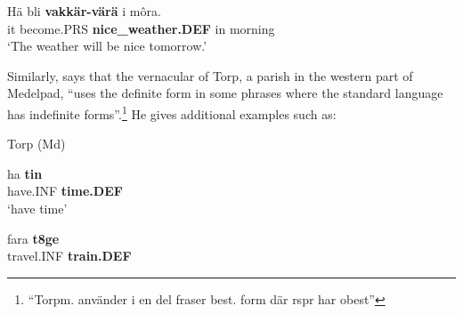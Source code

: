 
 \ea\label{}
\gll Hä  bli  \textbf{vakkär-värä} i  môra.\\


it  become.PRS  \textbf{nice\_weather.DEF} in  morning\\

\glt ‘The weather will be nice tomorrow.’

\z

Similarly, \citet[140]{Bogren1921} says that the vernacular of Torp, a parish in the western part of Medelpad, “uses the definite form in some phrases where the standard language has indefinite forms”.\footnote{ “Torpm. använder i en del fraser best. form där rspr har obest”} He gives additional examples such as:


\item 

Torp (Md)



\item 


 \ea\label{}
\gll ha  \textbf{tin} \\


have.INF  \textbf{time.DEF} \\

\glt ‘have time’

\z

\item 


 \ea\label{}
\gll fara  \textbf{t}\textbf{8}\textbf{ge}\\


travel.INF  \textbf{train.DEF}\\

